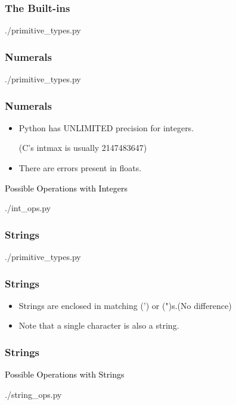 \documentclass{beamer}
\begin{document}
\begin{frame}
  \frametitle{The Built-ins}
    \begin{lstinputlisting}
      {./primitive_types.py}
    \end{lstinputlisting}
\end{frame}

\begin{frame}
  \frametitle{Numerals}
    \begin{lstinputlisting}[firstline=1, lastline=6]
      {./primitive_types.py}
    \end{lstinputlisting}
\end{frame}

\begin{frame}
  \frametitle{Numerals}
  \begin{itemize}
    \item Python has \alert{UNLIMITED} precision for integers.

      (C's intmax is usually 2147483647)
    \item There are errors present in floats.
  \end{itemize}

\end{frame}

\begin{frame}
  \textcolor{black}{\large{Possible Operations with Integers}}
    \begin{lstinputlisting}
      {./int_ops.py}
    \end{lstinputlisting}
\end{frame}

\begin{frame}
  \frametitle{Strings}
    \begin{lstinputlisting}[firstline=8, lastline=12]
      {./primitive_types.py}
    \end{lstinputlisting}

\end{frame}

\begin{frame}
  \frametitle{Strings}
  \begin{itemize}
    \item Strings are enclosed in matching (') or (")s.(No difference)
    \item Note that a single character is also a string.
  \end{itemize}
\end{frame}

\begin{frame}
  \frametitle{Strings}
  \textcolor{black}{\large{Possible Operations with Strings}}
  \begin{lstinputlisting}
    {./string_ops.py}
  \end{lstinputlisting}
\end{frame}
\end{document}
